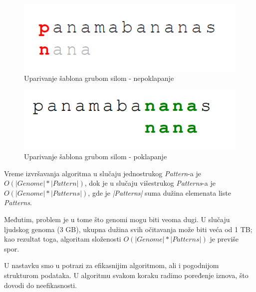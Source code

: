 \begin{minipage}{\textwidth}
	\centering
	\begin{minipage}{0.45\textwidth}
		\begin{figure}[H]
			\centering
			\includegraphics[width=\textwidth]{poglavlja//9/slike/GrubaSilaGreska.png}
			\caption{Uparivanje šablona grubom silom - nepoklapanje}
			\label{bfNepoklapanje}
		\end{figure} 
	\end{minipage}
	\hfill 
	\begin{minipage}{0.45\textwidth}
		\begin{figure}[H]
			\centering
			\includegraphics[width=\textwidth]{poglavlja/9/slike/GrubaSilaPogodak.png}
			\caption{Uparivanje šablona grubom silom - poklapanje}
			\label{bfPoklapanje}
		\end{figure}  
	\end{minipage}
	\vspace*{1em}
\end{minipage}

Vreme izvršavanja algoritma u slučaju jednostrukog \textit{Pattern}-a je $O(|Genome| * |Pattern|)$, dok je u slučaju višestrukog \textit{Patterns}-a je $O(|Genome| * |Patterns|)$, gde je \textit{|Patterns|} suma dužina elemenata liste \textit{Patterns}. 

Međutim, problem je u tome što genomi mogu biti veoma dugi. U slučaju ljudskog genoma (3 GB), ukupna dužina svih očitavanja može biti veća od 1 TB; kao rezultat toga, algoritam složenosti $O(|Genome| * |Patterns|)$ je previše spor.

U nastavku smo u potrazi za efikasnijim algoritmom, ali i pogodnijom strukturom podataka. U algoritmu svakom koraku radimo poređenje iznova, što dovodi do neefikasnosti. 

